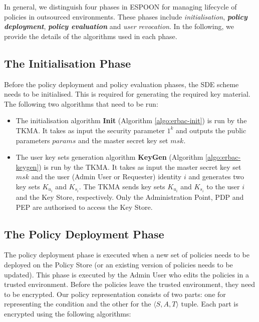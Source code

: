 \documentclass[epsfig,a4paper,11pt,titlepage]{book}
\numberwithin{algorithm}{chapter}
\begin{document}
In general, we distinguish four phases in \gls{ESPOON} for managing lifecycle of policies in outsourced environments. These phases include \emph{initialisation}, \emph{\textbf{policy deployment}}, \emph{\textbf{policy evaluation}} and \emph{user revocation}. In the following, we provide the details of the algorithms used in each phase.

\subsection{The Initialisation Phase}
Before the policy deployment and policy evaluation phases, the \gls{SDE} scheme needs to be initialised. This is required for generating the required key material. The following two algorithms that need to be run:

\begin{itemize}

\item The initialisation algorithm \textbf{Init} (Algorithm \ref{algo:erbac-init}) is run by the \gls{TKMA}. It takes as input the security parameter $1^k$ and outputs the public parameters $params$ and the master secret key set $msk$.

\item The user key sets generation algorithm \textbf{KeyGen} (Algorithm \ref{algo:erbac-keygen}) is run by the \gls{TKMA}. It takes as input the master secret key set $msk$ and the user (Admin User or Requester) identity $i$ and generates two key sets $K_{u_i}$ and $K_{s_i}$. The \gls{TKMA} sends key sets $K_{u_i}$ and $K_{s_i}$ to the user $i$ and the Key Store, respectively. Only the Administration Point, \gls{PDP} and \gls{PEP} are authorised to access the Key Store.

\end{itemize}

\subsection{The Policy Deployment Phase}
The policy deployment phase is executed when a new set of policies needs to be deployed on the Policy Store (or an existing version of policies needs to be updated). This phase is executed by the Admin User who edits the policies in a trusted environment. Before the policies leave the trusted environment, they need to be encrypted. Our policy representation consists of two parts: one for representing the condition and the other for the $\langle S, A, T \rangle$ tuple. Each part is encrypted using the following algorithms:
\end{document}
